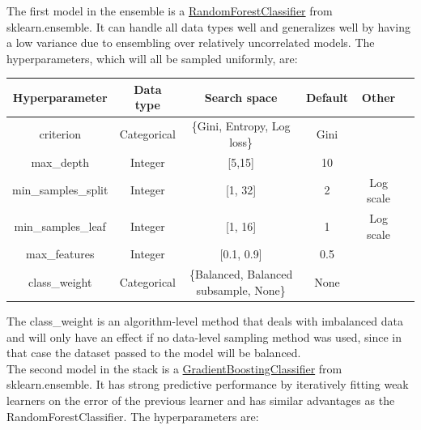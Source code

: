 \documentclass[11pt]{article}
\begin{document}
The first model in the ensemble is a \href{https://scikit-learn.org/stable/modules/generated/sklearn.ensemble.RandomForestClassifier.html}{RandomForestClassifier} from sklearn.ensemble. It can handle all data types well and generalizes well by having a low variance due to ensembling over relatively uncorrelated models. The hyperparameters, which will all be sampled uniformly, are:

\vspace{-0.3cm}
\begin{table}[h]
\begin{tabular}{ | c | c | c | c | c | c | }
 \hline
  Hyperparameter & Data type & Search space & Default & Other \\
 \hline
 criterion & Categorical & \{Gini, Entropy, Log loss\} & Gini &   \\ 
 max\_depth  & Integer & [5,15] & 10 &  \\ 
 min\_samples\_split & Integer & [1, 32] & 2 & Log scale \\ 
 min\_samples\_leaf & Integer & [1, 16] & 1 & Log scale  \\ 
 max\_features & Integer & [0.1, 0.9] & 0.5 &   \\  
 class\_weight & Categorical & \{Balanced, Balanced subsample, None\}  & None &  \\ 
 \hline
\end{tabular}
\end{table}
\vspace{-0.3cm}

The class\_weight is an algorithm-level method that deals with imbalanced data and will only have an effect if no data-level sampling method was used, since in that case the dataset passed to the model will be balanced. \\

The second model in the stack is a \href{https://scikit-learn.org/stable/modules/generated/sklearn.ensemble.GradientBoostingClassifier.html}{GradientBoostingClassifier} from sklearn.ensemble. It has strong predictive performance by iteratively fitting weak learners on the error of the previous learner and has similar advantages as the RandomForestClassifier. The hyperparameters are:
\end{document}
